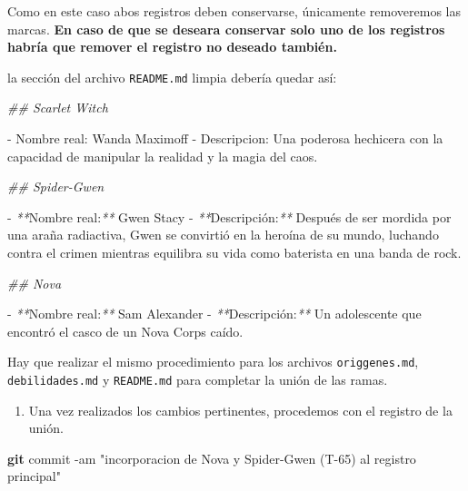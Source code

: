 \documentclass[
]{book}
\newenvironment{Shaded}{\begin{snugshade}}{\end{snugshade}}
\newcommand{\AttributeTok}[1]{\textcolor[rgb]{0.13,0.29,0.53}{#1}}
\newcommand{\CommentTok}[1]{\textcolor[rgb]{0.56,0.35,0.01}{\textit{#1}}}
\newcommand{\ExtensionTok}[1]{#1}
\newcommand{\FunctionTok}[1]{\textcolor[rgb]{0.13,0.29,0.53}{\textbf{#1}}}
\newcommand{\NormalTok}[1]{#1}
\newcommand{\PreprocessorTok}[1]{\textcolor[rgb]{0.56,0.35,0.01}{\textit{#1}}}
\newcommand{\StringTok}[1]{\textcolor[rgb]{0.31,0.60,0.02}{#1}}
\providecommand{\tightlist}{%
  \setlength{\itemsep}{0pt}\setlength{\parskip}{0pt}}
\begin{document}
Como en este caso abos registros deben conservarse, únicamente removeremos las marcas. \textbf{En caso de que se deseara conservar solo uno de los registros habría que remover el registro no deseado también.}

la sección del archivo \texttt{README.md} limpia debería quedar así:

\begin{Shaded}
\begin{Highlighting}[]
\CommentTok{\#\# Scarlet Witch}

\ExtensionTok{{-}}\NormalTok{ Nombre real: Wanda Maximoff}
\ExtensionTok{{-}}\NormalTok{ Descripcion: Una poderosa hechicera con la capacidad de manipular la realidad y la magia del caos.}

\CommentTok{\#\# Spider{-}Gwen}

\ExtensionTok{{-}} \PreprocessorTok{**}\NormalTok{Nombre real:}\PreprocessorTok{**}\NormalTok{ Gwen Stacy}
\ExtensionTok{{-}} \PreprocessorTok{**}\NormalTok{Descripción:}\PreprocessorTok{**}\NormalTok{ Después de ser mordida por una araña radiactiva, Gwen se convirtió en la heroína de su mundo, luchando contra el crimen mientras equilibra su vida como baterista en una banda de rock.}

\CommentTok{\#\# Nova}

\ExtensionTok{{-}} \PreprocessorTok{**}\NormalTok{Nombre real:}\PreprocessorTok{**}\NormalTok{ Sam Alexander}
\ExtensionTok{{-}} \PreprocessorTok{**}\NormalTok{Descripción:}\PreprocessorTok{**}\NormalTok{ Un adolescente que encontró el casco de un Nova Corps caído.}
\end{Highlighting}
\end{Shaded}

Hay que realizar el mismo procedimiento para los archivos \texttt{origgenes.md}, \texttt{debilidades.md} y \texttt{README.md} para completar la unión de las ramas.

\begin{enumerate}
\def\labelenumi{\arabic{enumi}.}
\setcounter{enumi}{7}
\tightlist
\item
  Una vez realizados los cambios pertinentes, procedemos con el registro de la unión.
\end{enumerate}

\begin{Shaded}
\begin{Highlighting}[]
\FunctionTok{git}\NormalTok{ commit }\AttributeTok{{-}am} \StringTok{"incorporacion de Nova y Spider{-}Gwen (T{-}65) al registro principal"}
\end{Highlighting}
\end{Shaded}
\end{document}
